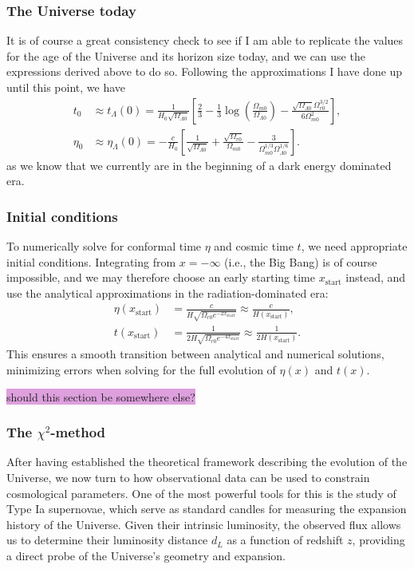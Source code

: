 \documentclass{aa}
\begin{document}
\subsubsection{The Universe today}
It is of course a great consistency check to see if I am able to replicate the values for the age of the Universe and its horizon size today, and we can use the expressions derived above to do so. Following the approximations I have done up until this point, we have
\begin{align}
  t_0 &\approx t_{\Lambda}(0) = \frac{1}{H_0\sqrt{\Omega_{\Lambda0}}}\left[\frac{2}{3}-\frac{1}{3}\log\left(\frac{\Omega_{m0}}{\Omega_{\Lambda0}}\right)-\frac{\sqrt{\Omega_{\Lambda0}}\Omega_{r0}^{3/2}}{6\Omega^2_{m0}}\right],
  \\
  \eta_0 &\approx \eta_\Lambda(0) = -\frac{c}{H_0}\left[\frac{1}{\sqrt{\Omega_{\Lambda0}}} +\frac{\sqrt{\Omega_{r0}}}{\Omega_{m0}} - \frac{3}{\Omega_{m0}^{1/3}\Omega_{\Lambda0}^{1/6}} \right].
\end{align}
as we know that we currently are in the beginning of a dark energy dominated era.


\subsubsection{Initial conditions}
To numerically solve for conformal time $\eta$ and cosmic time $t$, we need appropriate initial conditions. Integrating from $x = -\infty$ (i.e., the Big Bang) is of course impossible, and we may therefore choose an early starting time $x_{\text{start}}$ instead, and use the analytical approximations in the radiation-dominated era:
\begin{align}
  \eta(x_{\text{start}}) &= \frac{c}{H\sqrt{\Omega_{r0}e^{-2x_\text{start}}}} \approx \frac{c}{H(x_{\text{start}})},
  \\
  t(x_{\text{start}}) &= \frac{1}{2H\sqrt{\Omega_{r0}e^{-4x_\text{start}}}} \approx \frac{1}{2H(x_{\text{start}})}.
\end{align}
This ensures a smooth transition between analytical and numerical solutions, minimizing errors when solving for the full evolution of $\eta(x)$ and $t(x)$.

\colorbox{Plum}{should this section be somewhere else?}


\subsubsection{The \texorpdfstring{$\chi^2$}{Lg}-method}
After having established the theoretical framework describing the evolution of the Universe, we now turn to how observational data can be used to constrain cosmological parameters. One of the most powerful tools for this is the study of Type Ia supernovae, which serve as standard candles for measuring the expansion history of the Universe. Given their intrinsic luminosity, the observed flux allows us to determine their luminosity distance $d_L$ as a function of redshift $z$, providing a direct probe of the Universe's geometry and expansion.
\end{document}
